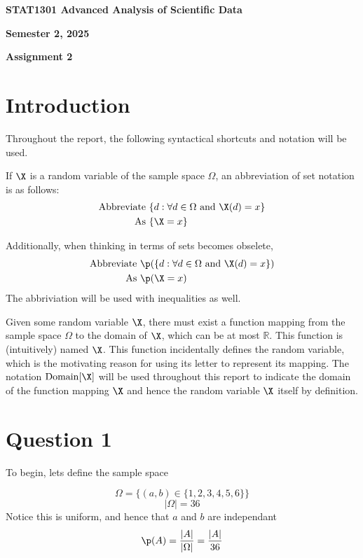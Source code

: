 \begin{center}

{\Large  {\bf STAT1301 Advanced Analysis of Scientific Data}}
\medskip

{\large {\bf Semester 2, 2025}}

\medskip

{\large {\bf Assignment 2}}


\end{center}

\section{Introduction}

Throughout the report, the following syntactical shortcuts and notation will be used.

If $\X$ is a random variable of the sample space $\Omega$, an abbreviation of set notation is as follows:
\begin{align}
\text{Abbreviate	} & \{ d : \forall d \in \Omega \text{ and } \X(d) = x \} \\
\text{As	} & \{ \X = x \}
\end{align}

Additionally, when thinking in terms of sets becomes obselete,
\begin{align}
\text{Abbreviate	} & \p (\{ d : \forall d \in \Omega \text{ and } \X(d) = x \}) \\
\text{As	} & \p (\X = x)
\end{align}
The abbriviation will be used with inequalities as well.

Given some random variable $\X$, there must exist a function mapping from the sample space $\Omega$ to the domain of $\X$,
which can be at most $\mathbb{R}$. This function is (intuitively) named $\X$.
This function incidentally defines the random variable, which is the motivating reason for using its letter to represent its mapping.
The notation $\mathrm{Domain}[\X]$ will be used throughout this report to indicate the domain of the function mapping $\X$ and hence
the random variable $\X$ itself by definition.

\section{Question 1}

To begin, lets define the sample space

\[
\Omega = \{ (a, b) \in \{ 1, 2, 3, 4, 5, 6 \} \}
\]
\[
|\Omega| = 36
\]
Notice this is uniform, and hence that $a$ and $b$ are independant
\begin{equation}
\label{eq:q1-uniform-p}
\p (A) = \frac{|A|}{|\Omega|} = \frac{|A|}{36}
\end{equation}


